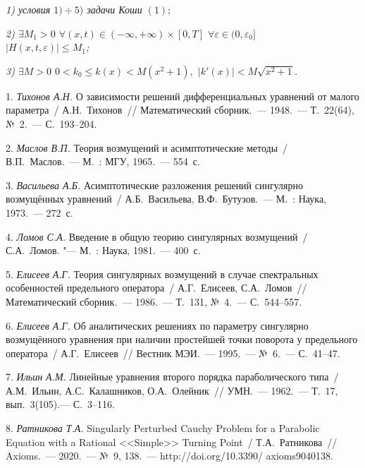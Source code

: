 {\it 1) условия $1)\div 5)$ задачи Коши $(1)$};

{\it 2) $\exists M_1>0$ $\forall(x,t)\in(-\infty,+\infty)\times[0,T]$ $\forall\varepsilon\in(0,\varepsilon_0]$ \\
$|H(x,t,\varepsilon)|\le M_1$;}

{\it 3) $\exists M>0$ $0<k_0\leq k(x)<M(x^2+1),$ $|k'(x)|<M \sqrt{x^2+1}$.}

\noindent {\it Тогда $\exists \mathbb{C}>0$ $\forall(x,t)\in(-\infty,+\infty)\times[0,T]$ $\forall\varepsilon\in(0,\varepsilon_0]$ $|R_n(x,t,\varepsilon)|\le \mathbb{C}.$ }

\litlist


1. {\it Тихонов А.Н.} О зависимости решений дифференциальных уравнений от малого параметра~/ А.Н.~Тихонов~// Математический сборник.~--- 1948.~--- Т.~22(64), №~2.~--- С.~193--204.

2. {\it Маслов В.П.} Теория возмущений и асимптотические методы~/ В.П.~Маслов.~--- М.~: МГУ, 1965.~--- 554~с.

3. {\it Васильева А.Б.} Асимптотические разложения решений сингулярно возмущённых уравнений~/ А.Б.~Васильева, В.Ф.~Бутузов.~--- М.~: Наука, 1973.~--- 272~с.

4. {\it Ломов С.А.} Введение в общую теорию сингулярных возмущений~/ С.А.~Ломов. "--- М.~: Наука, 1981.~--- 400~с.

5. {\it Елисеев А.Г.} Теория сингулярных возмущений в случае спектральных особенностей предельного оператора~/ А.Г.~Елисеев, \linebreak С.А.~Ломов~// Математический сборник.~--- 1986.~--- Т.~131, №~4.~--- С.~544--557.

6. {\it Елисеев А.Г.} Об аналитических решениях по параметру сингулярно возмущённого уравнения при наличии простейшей точки поворота у предельного оператора~/ А.Г.~Елисеев~// Вестник МЭИ.~--- 1995.~--- №~6.~--- С.~41--47.

7. {\it Ильин А.М.} Линейные уравнения второго порядка параболического типа~/ А.М.~Ильин, А.С.~Калашников, О.А.~Олейник~// УМН.~--- 1962.~--- Т.~17, вып.~3(105).--- С.~3--116.

8. {\it Ратникова Т.А.} \foreignlanguage{english}{Singularly Perturbed Cauchy Problem for a Parabolic Equation with a Rational <<Simple>> Turning Point}~/ Т.А.~Ратникова~// \foreignlanguage{english}{Axioms}.~--- 2020.~--- №~9, 138.~--- http://doi.org/10.3390/ axioms9040138.

